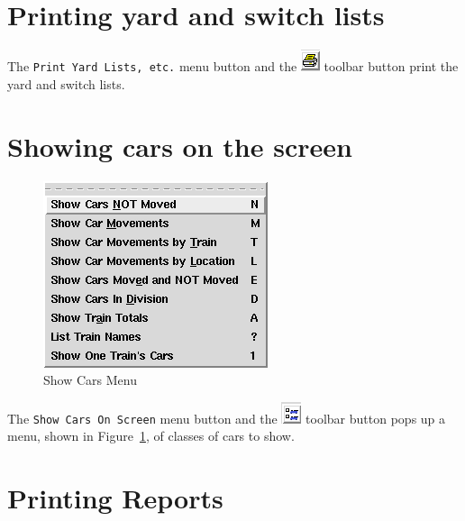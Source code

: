 \section{Printing yard and switch lists}

The \verb=Print Yard Lists, etc.= menu button and the
\includegraphics{FCFPrintYardTool.png} toolbar button print the yard and
switch lists.

\section{Showing cars on the screen}

\begin{figure}[hbpt]
\begin{centering}
\includegraphics{FCFShowCarsMenu.png}
\caption{Show Cars Menu}
\label{fig:fcf:showcarsmenu}
\end{centering}
\end{figure}
The \verb=Show Cars On Screen= menu button and the
\includegraphics{FCFShowCarsTool.png} toolbar button pops up a menu,
shown in Figure~\ref{fig:fcf:showcarsmenu}, of classes of cars to show.

\section{Printing Reports}

